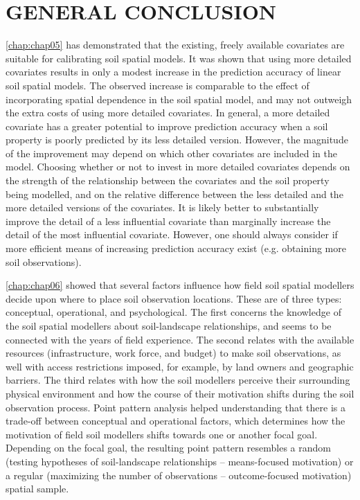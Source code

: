 \artigofalse
\chapter{GENERAL CONCLUSION}
\label{chap:conclusion}

\autoref{chap:chap05} has demonstrated that the existing, freely available covariates are suitable for 
calibrating soil spatial models. It was shown that using more detailed covariates results in only a modest 
increase in the prediction accuracy of linear soil spatial models. The observed increase is comparable to the 
effect of incorporating spatial dependence in the soil spatial model, and may not outweigh the extra costs of 
using more detailed covariates. In general, a more detailed covariate has a greater potential to improve 
prediction accuracy when a soil property is poorly predicted by its less detailed version. However, the 
magnitude of the improvement may depend on which other covariates are included in the model. Choosing whether 
or not to invest in more detailed covariates depends on the strength of the relationship between the 
covariates and the soil property being modelled, and on the relative difference between the less detailed and 
the more detailed versions of the covariates. It is likely better to substantially improve the detail of a 
less influential covariate than marginally increase the detail of the most influential covariate. However, one 
should always consider if more efficient means of increasing prediction accuracy exist (e.g. obtaining more 
soil observations).

\autoref{chap:chap06} showed that several factors influence how field soil spatial modellers decide upon where 
to place soil observation locations. These are of three types: conceptual, operational, and psychological. The 
first concerns the knowledge of the soil spatial modellers about soil-landscape relationships, and seems to be 
connected with the years of field experience. The second relates with the available resources (infrastructure, 
work force, and budget) to make soil observations, as well with access restrictions imposed, for example, by 
land owners and geographic barriers. The third relates with how the soil modellers perceive their surrounding 
physical environment and how the course of their motivation shifts during the soil observation process. Point 
pattern analysis helped understanding that there is a trade-off between conceptual and operational factors, 
which determines how the motivation of field soil modellers shifts towards one or another focal goal. 
Depending on the focal goal, the resulting point pattern resembles a random (testing hypotheses of 
soil-landscape relationships -- means-focused motivation) or a regular (maximizing the number of observations 
-- outcome-focused motivation) spatial sample.

   

